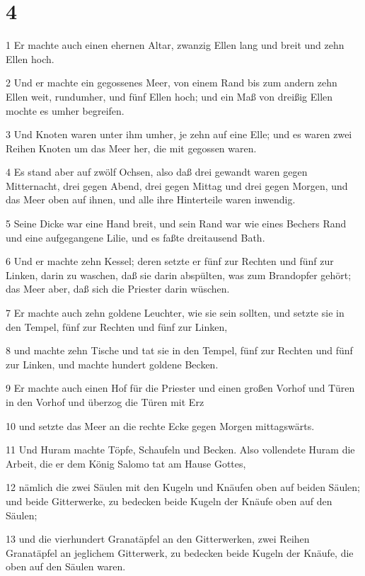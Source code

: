 \chapter{4}

\par 1 Er machte auch einen ehernen Altar, zwanzig Ellen lang und breit und zehn Ellen hoch.
\par 2 Und er machte ein gegossenes Meer, von einem Rand bis zum andern zehn Ellen weit, rundumher, und fünf Ellen hoch; und ein Maß von dreißig Ellen mochte es umher begreifen.
\par 3 Und Knoten waren unter ihm umher, je zehn auf eine Elle; und es waren zwei Reihen Knoten um das Meer her, die mit gegossen waren.
\par 4 Es stand aber auf zwölf Ochsen, also daß drei gewandt waren gegen Mitternacht, drei gegen Abend, drei gegen Mittag und drei gegen Morgen, und das Meer oben auf ihnen, und alle ihre Hinterteile waren inwendig.
\par 5 Seine Dicke war eine Hand breit, und sein Rand war wie eines Bechers Rand und eine aufgegangene Lilie, und es faßte dreitausend Bath.
\par 6 Und er machte zehn Kessel; deren setzte er fünf zur Rechten und fünf zur Linken, darin zu waschen, daß sie darin abspülten, was zum Brandopfer gehört; das Meer aber, daß sich die Priester darin wüschen.
\par 7 Er machte auch zehn goldene Leuchter, wie sie sein sollten, und setzte sie in den Tempel, fünf zur Rechten und fünf zur Linken,
\par 8 und machte zehn Tische und tat sie in den Tempel, fünf zur Rechten und fünf zur Linken, und machte hundert goldene Becken.
\par 9 Er machte auch einen Hof für die Priester und einen großen Vorhof und Türen in den Vorhof und überzog die Türen mit Erz
\par 10 und setzte das Meer an die rechte Ecke gegen Morgen mittagswärts.
\par 11 Und Huram machte Töpfe, Schaufeln und Becken. Also vollendete Huram die Arbeit, die er dem König Salomo tat am Hause Gottes,
\par 12 nämlich die zwei Säulen mit den Kugeln und Knäufen oben auf beiden Säulen; und beide Gitterwerke, zu bedecken beide Kugeln der Knäufe oben auf den Säulen;
\par 13 und die vierhundert Granatäpfel an den Gitterwerken, zwei Reihen Granatäpfel an jeglichem Gitterwerk, zu bedecken beide Kugeln der Knäufe, die oben auf den Säulen waren.
